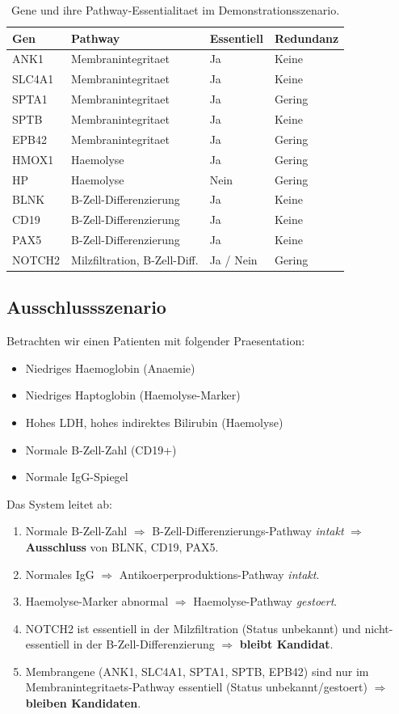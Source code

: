 \documentclass[12pt,a4paper]{article}
\begin{document}
\begin{table}[H]
\centering
\caption{Gene und ihre Pathway-Essentialitaet im Demonstrationsszenario.}
\label{tab:genes}
\begin{tabular}{llll}
\toprule
\textbf{Gen} & \textbf{Pathway} & \textbf{Essentiell} & \textbf{Redundanz} \\
\midrule
ANK1 & Membranintegritaet & Ja & Keine \\
SLC4A1 & Membranintegritaet & Ja & Keine \\
SPTA1 & Membranintegritaet & Ja & Gering \\
SPTB & Membranintegritaet & Ja & Keine \\
EPB42 & Membranintegritaet & Ja & Gering \\
HMOX1 & Haemolyse & Ja & Gering \\
HP & Haemolyse & Nein & Gering \\
BLNK & B-Zell-Differenzierung & Ja & Keine \\
CD19 & B-Zell-Differenzierung & Ja & Keine \\
PAX5 & B-Zell-Differenzierung & Ja & Keine \\
NOTCH2 & Milzfiltration, B-Zell-Diff. & Ja / Nein & Gering \\
\bottomrule
\end{tabular}
\end{table}

\subsection{Ausschlussszenario}

Betrachten wir einen Patienten mit folgender Praesentation:
\begin{itemize}
    \item Niedriges Haemoglobin (Anaemie)
    \item Niedriges Haptoglobin (Haemolyse-Marker)
    \item Hohes LDH, hohes indirektes Bilirubin (Haemolyse)
    \item Normale B-Zell-Zahl (CD19+)
    \item Normale IgG-Spiegel
\end{itemize}

Das System leitet ab:
\begin{enumerate}
    \item Normale B-Zell-Zahl $\Rightarrow$ B-Zell-Differenzierungs-Pathway \emph{intakt} $\Rightarrow$ \textbf{Ausschluss} von BLNK, CD19, PAX5.
    \item Normales IgG $\Rightarrow$ Antikoerperproduktions-Pathway \emph{intakt}.
    \item Haemolyse-Marker abnormal $\Rightarrow$ Haemolyse-Pathway \emph{gestoert}.
    \item NOTCH2 ist essentiell in der Milzfiltration (Status unbekannt) und nicht-essentiell in der B-Zell-Differenzierung $\Rightarrow$ \textbf{bleibt Kandidat}.
    \item Membrangene (ANK1, SLC4A1, SPTA1, SPTB, EPB42) sind nur im Membranintegritaets-Pathway essentiell (Status unbekannt/gestoert) $\Rightarrow$ \textbf{bleiben Kandidaten}.
\end{enumerate}
\end{document}
